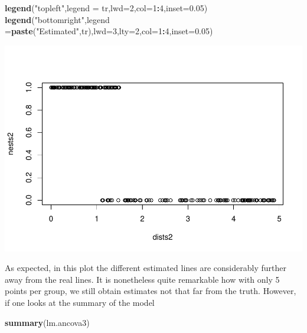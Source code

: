\documentclass[
]{book}
\newenvironment{Shaded}{\begin{snugshade}}{\end{snugshade}}
\newcommand{\AttributeTok}[1]{\textcolor[rgb]{0.13,0.29,0.53}{#1}}
\newcommand{\DecValTok}[1]{\textcolor[rgb]{0.00,0.00,0.81}{#1}}
\newcommand{\FloatTok}[1]{\textcolor[rgb]{0.00,0.00,0.81}{#1}}
\newcommand{\FunctionTok}[1]{\textcolor[rgb]{0.13,0.29,0.53}{\textbf{#1}}}
\newcommand{\NormalTok}[1]{#1}
\newcommand{\SpecialCharTok}[1]{\textcolor[rgb]{0.81,0.36,0.00}{\textbf{#1}}}
\newcommand{\StringTok}[1]{\textcolor[rgb]{0.31,0.60,0.02}{#1}}
\begin{document}
\begin{Shaded}
\begin{Highlighting}[]
\FunctionTok{legend}\NormalTok{(}\StringTok{"topleft"}\NormalTok{,}\AttributeTok{legend =}\NormalTok{ tr,}\AttributeTok{lwd=}\DecValTok{2}\NormalTok{,}\AttributeTok{col=}\DecValTok{1}\SpecialCharTok{:}\DecValTok{4}\NormalTok{,}\AttributeTok{inset=}\FloatTok{0.05}\NormalTok{)}
\FunctionTok{legend}\NormalTok{(}\StringTok{"bottomright"}\NormalTok{,}\AttributeTok{legend =}\FunctionTok{paste}\NormalTok{(}\StringTok{"Estimated"}\NormalTok{,tr),}\AttributeTok{lwd=}\DecValTok{3}\NormalTok{,}\AttributeTok{lty=}\DecValTok{2}\NormalTok{,}\AttributeTok{col=}\DecValTok{1}\SpecialCharTok{:}\DecValTok{4}\NormalTok{,}\AttributeTok{inset=}\FloatTok{0.05}\NormalTok{)}
\end{Highlighting}
\end{Shaded}

\includegraphics{ECOMODbook_files/figure-latex/unnamed-chunk-9-1.pdf}

As expected, in this plot the different estimated lines are considerably further away from the real lines. It is nonetheless quite remarkable how with only 5 points per group, we still obtain estimates not that far from the truth. However, if one looks at the summary of the model

\begin{Shaded}
\begin{Highlighting}[]
\FunctionTok{summary}\NormalTok{(lm.ancova3)}
\end{Highlighting}
\end{Shaded}
\end{document}
